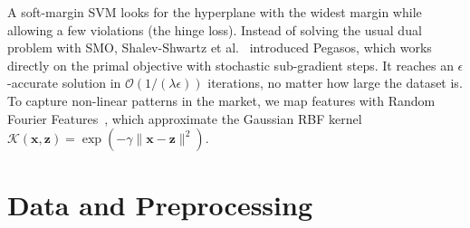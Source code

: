 \documentclass[10pt,twocolumn,a4paper]{article}
\begin{document}
  A soft-margin SVM looks for the hyperplane with the widest margin while allowing a few violations (the hinge loss). Instead of solving the usual dual problem with SMO, Shalev-Shwartz et al.~\cite{pegasos} introduced Pegasos, which works directly on the primal objective with stochastic sub-gradient steps. It reaches an $\epsilon$-accurate solution in $\mathcal{O}(1/(\lambda\epsilon))$ iterations, no matter how large the dataset is. To capture non-linear patterns in the market, we map features with Random Fourier Features~\cite{rahimi2007}, which approximate the Gaussian RBF kernel $\mathcal{K}(\mathbf{x}, \mathbf{z}) = \exp(-\gamma \|\mathbf{x} - \mathbf{z}\|^2)$.

  \section{Data and Preprocessing}
\end{document}
